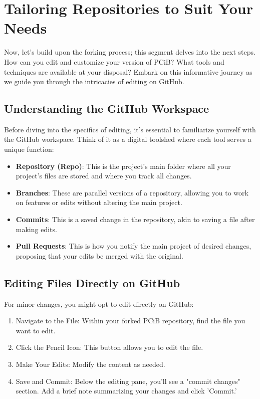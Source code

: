 \documentclass[a4paper,12pt]{book}
\begin{document}
\section*{Tailoring Repositories to Suit Your Needs}
Now, let's build upon the forking process; this segment delves into the next steps. How can you edit and customize your version of PCiB? What tools and techniques are available at your disposal? Embark on this informative journey as we guide you through the intricacies of editing on GitHub.

\subsection*{Understanding the GitHub Workspace}
Before diving into the specifics of editing, it's essential to familiarize yourself with the GitHub workspace. Think of it as a digital toolshed where each tool serves a unique function:

\begin{itemize}
    \item \textbf{Repository (Repo)}: This is the project's main folder where all your project's files are stored and where you track all changes.
    \item \textbf{Branches}: These are parallel versions of a repository, allowing you to work on features or edits without altering the main project.
    \item \textbf{Commits}: This is a saved change in the repository, akin to saving a file after making edits.
    \item \textbf{Pull Requests}: This is how you notify the main project of desired changes, proposing that your edits be merged with the original.
\end{itemize}

\subsection*{Editing Files Directly on GitHub}
For minor changes, you might opt to edit directly on GitHub:

\begin{enumerate}
    \item Navigate to the File: Within your forked PCiB repository, find the file you want to edit.
    \item Click the Pencil Icon: This button allows you to edit the file.
    \item Make Your Edits: Modify the content as needed.
    \item Save and Commit: Below the editing pane, you'll see a "commit changes" section. Add a brief note summarizing your changes and click 'Commit.'
\end{enumerate}
\end{document}

